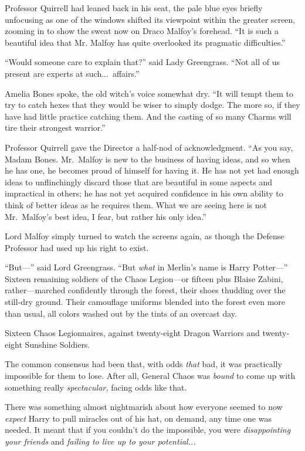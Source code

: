 Professor Quirrell had leaned back in his seat, the pale blue
eyes briefly unfocusing as one of the windows shifted its viewpoint
within the greater screen, zooming in to show the sweat now on
Draco Malfoy’s forehead. “It is such a beautiful idea that Mr.
Malfoy has quite overlooked its pragmatic difficulties.”

“Would someone care to explain that?” said Lady Greengrass. “Not
all of us present are experts at such...\ affairs.”

Amelia Bones spoke, the old witch’s voice somewhat dry. “It will
tempt them to try to catch hexes that they would be wiser to simply
dodge. The more so, if they have had little practice catching them.
And the casting of so many Charms will tire their strongest
warrior.”

Professor Quirrell gave the  Director a half-nod of
acknowledgment. “As you say, Madam Bones. Mr.~Malfoy is new to the
business of having ideas, and so when he has one, he becomes proud
of himself for having it. He has not yet had enough ideas to
unflinchingly discard those that are beautiful in some aspects and
impractical in others; he has not yet acquired confidence in his
own ability to think of better ideas as he requires them. What we
are seeing here is not Mr.~Malfoy’s best idea, I fear, but rather
his only idea.”

Lord Malfoy simply turned to watch the screens again, as though
the Defense Professor had used up his right to exist.

“But—” said Lord Greengrass. “But \emph{what} in Merlin’s name
is Harry Potter—”
\sbreak
Sixteen remaining soldiers of the Chaos Legion—or fifteen plus
Blaise Zabini, rather—marched confidently through the forest,
their shoes thudding over the still-dry ground. Their camouflage
uniforms blended into the forest even more than usual, all colors
washed out by the tints of an overcast day.

Sixteen Chaos Legionnaires, against twenty-eight Dragon Warriors
and twenty-eight Sunshine Soldiers.

The common consensus had been that, with odds \emph{that} bad,
it was practically impossible for them to lose. After all, General
Chaos was \emph{bound} to come up with something really
\emph{spectacular,} facing odds like that.

There was something almost nightmarish about how everyone seemed
to now \emph{expect} Harry to pull miracles out of his hat, on
demand, any time one was needed. It meant that if you couldn’t do
the impossible, you were \emph{disappointing your friends} and
\emph{failing to live up to your potential...}

